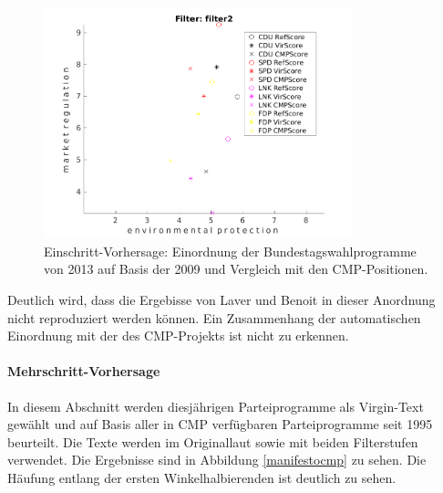     \begin{figure}
    
        \includegraphics[width = 0.8\textwidth]{images/one_environmental_protection_market_regulation_filter2.png}
        \caption{Einschritt-Vorhersage: Einordnung der Bundestagswahlprogramme von 2013 auf Basis der 2009 und Vergleich mit den CMP-Positionen. 
                 \label{fig:one20092013}}
    \end{figure}
    
Deutlich wird, dass die Ergebisse von Laver und Benoit in dieser Anordnung nicht reproduziert werden können. Ein Zusammenhang der automatischen Einordnung mit der des CMP-Projekts ist nicht zu erkennen.      
    
    \paragraph{Mehrschritt-Vorhersage}
     In diesem Abschnitt werden diesjährigen Parteiprogramme als Virgin-Text gewählt und auf Basis aller in CMP verfügbaren Parteiprogramme seit 1995 beurteilt. Die Texte werden im Originallaut sowie mit beiden Filterstufen verwendet. 
     Die Ergebnisse sind in Abbildung \ref{manifestocmp} zu sehen. Die Häufung entlang der ersten Winkelhalbierenden ist deutlich zu sehen.
     
